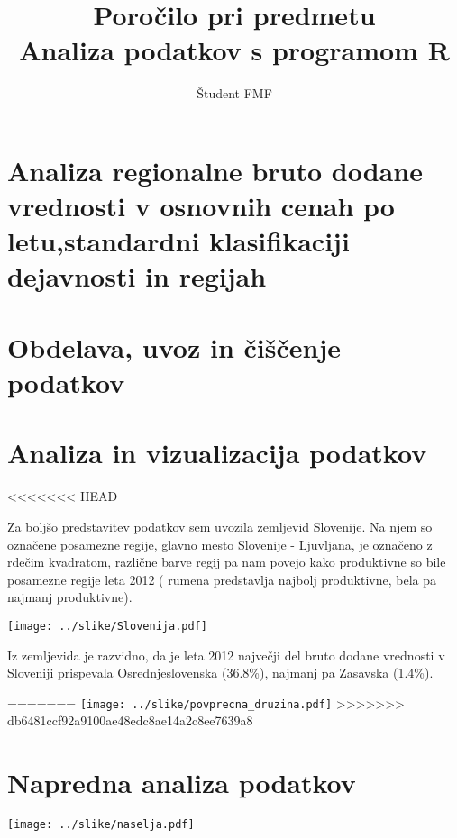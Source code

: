 \documentclass[11pt,a4paper]{article}
\begin{document}
\title{Poročilo pri predmetu \\
Analiza podatkov s programom R}
\author{Študent FMF}
\maketitle

\section{Analiza regionalne bruto dodane vrednosti v osnovnih cenah po letu,standardni klasifikaciji dejavnosti in regijah}

\section{Obdelava, uvoz in čiščenje podatkov}

\section{Analiza in vizualizacija podatkov}

<<<<<<< HEAD

Za boljšo predstavitev podatkov sem uvozila zemljevid Slovenije. Na njem so označene posamezne regije, glavno mesto Slovenije - Ljuvljana, je označeno z rdečim kvadratom, različne barve regij pa nam povejo kako produktivne so bile posamezne regije leta 2012 ( rumena predstavlja najbolj produktivne, bela pa najmanj produktivne).

\newpage
\begin{center}
 \texttt{[image: ../slike/Slovenija.pdf]}

\end{center}





Iz zemljevida je razvidno, da je leta 2012 največji del bruto dodane vrednosti v Sloveniji prispevala Osrednjeslovenska (36.8\%), najmanj pa Zasavska (1.4\%).

=======
\texttt{[image: ../slike/povprecna\_druzina.pdf]}
>>>>>>> db6481ccf92a9100ae48edc8ae14a2c8ee7639a8

\section{Napredna analiza podatkov}

\texttt{[image: ../slike/naselja.pdf]}
\end{document}
